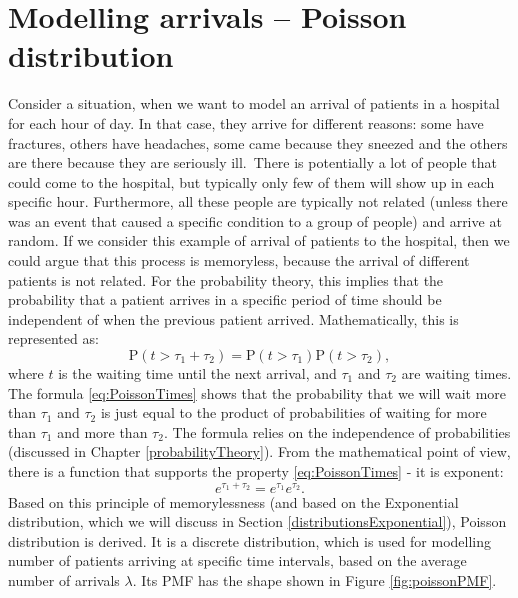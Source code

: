 \documentclass[
]{book}
\theoremstyle{definition}
\theoremstyle{definition}
\theoremstyle{definition}
\theoremstyle{definition}
\theoremstyle{remark}
\begin{document}
\hypertarget{distributionPoisson}{%
\section{Modelling arrivals -- Poisson distribution}\label{distributionPoisson}}

Consider a situation, when we want to model an arrival of patients in a hospital for each hour of day. In that case, they arrive for different reasons: some have fractures, others have headaches, some came because they sneezed and the others are there because they are seriously ill.~There is potentially a lot of people that could come to the hospital, but typically only few of them will show up in each specific hour. Furthermore, all these people are typically not related (unless there was an event that caused a specific condition to a group of people) and arrive at random. If we consider this example of arrival of patients to the hospital, then we could argue that this process is memoryless, because the arrival of different patients is not related. For the probability theory, this implies that the probability that a patient arrives in a specific period of time should be independent of when the previous patient arrived. Mathematically, this is represented as:
\begin{equation}
    \mathrm{P}(t > \tau_1 + \tau_2) = \mathrm{P}(t > \tau_1)\mathrm{P}(t > \tau_2),
    \label{eq:PoissonTimes}
\end{equation}
where \(t\) is the waiting time until the next arrival, and \(\tau_1\) and \(\tau_2\) are waiting times. The formula \eqref{eq:PoissonTimes} shows that the probability that we will wait more than \(\tau_1\) and \(\tau_2\) is just equal to the product of probabilities of waiting for more than \(\tau_1\) and more than \(\tau_2\). The formula relies on the independence of probabilities (discussed in Chapter \ref{probabilityTheory}). From the mathematical point of view, there is a function that supports the property \eqref{eq:PoissonTimes} - it is exponent:
\begin{equation}
    e^{\tau_1 + \tau_2} = e^{\tau_1} e^{\tau_2} .
    \label{eq:PoissonTimesExp}
\end{equation}
Based on this principle of memorylessness (and based on the Exponential distribution, which we will discuss in Section \ref{distributionsExponential}), Poisson distribution is derived. It is a discrete distribution, which is used for modelling number of patients arriving at specific time intervals, based on the average number of arrivals \(\lambda\). Its PMF has the shape shown in Figure \ref{fig:poissonPMF}.
\end{document}
